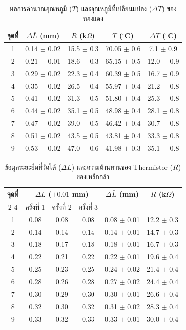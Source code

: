 \documentclass[11pt,a4paper]{article}
\begin{document}
\begin{table}[htbp]
\centering
\caption{ผลการคำนวณอุณหภูมิ ($T$) และอุณหภูมิที่เปลี่ยนแปลง ($\Delta T$) ของทองแดง}
\renewcommand{\arraystretch}{1.2}
\begin{tabular}{|c|c|c|c|c|}
\hline
จุดที่ 
& $\Delta \bar L$ (mm)
& $R$ (k$\Omega$)
& $T$ ($^\circ$C)
& $\Delta T$ ($^\circ$C) \\
\hline
1 & 0.14 $\pm$ 0.02 & 15.5 $\pm$ 0.3 & 70.05 $\pm$ 0.6 & 7.1 $\pm$ 0.9 \\
2 & 0.21 $\pm$ 0.01 & 18.6 $\pm$ 0.3 & 65.15 $\pm$ 0.5 & 12.0 $\pm$ 0.9 \\
3 & 0.29 $\pm$ 0.02 & 22.3 $\pm$ 0.4 & 60.39 $\pm$ 0.5 & 16.7 $\pm$ 0.9 \\
4 & 0.35 $\pm$ 0.02 & 26.5 $\pm$ 0.4 & 55.97 $\pm$ 0.4 & 21.2 $\pm$ 0.8 \\
5 & 0.41 $\pm$ 0.02 & 31.3 $\pm$ 0.5 & 51.80 $\pm$ 0.4 & 25.3 $\pm$ 0.8 \\
6 & 0.44 $\pm$ 0.02 & 35.1 $\pm$ 0.5 & 48.98 $\pm$ 0.4 & 28.1 $\pm$ 0.8 \\
7 & 0.47 $\pm$ 0.02 & 39.0 $\pm$ 0.5 & 46.42 $\pm$ 0.4 & 30.7 $\pm$ 0.8 \\
8 & 0.51 $\pm$ 0.02 & 43.5 $\pm$ 0.5 & 43.81 $\pm$ 0.4 & 33.3 $\pm$ 0.8 \\
9 & 0.53 $\pm$ 0.02 & 47.0 $\pm$ 0.6 & 41.98 $\pm$ 0.3 & 35.1 $\pm$ 0.8 \\
\hline
\end{tabular}
\end{table}



\begin{table}[htbp]
\centering
\caption{ข้อมูลระยะยืดที่วัดได้ ($\Delta L$) และความต้านทานของ Thermistor ($R$) ของเหล็กกล้า}
\renewcommand{\arraystretch}{1.2}
\begin{tabular}{|c|ccc|c|c|}
\hline
จุดที่ 
& \multicolumn{3}{c|}{$\Delta L$ ($\pm 0.01$ mm)} 
& $\Delta \bar L$ (mm)
& $R$ (k$\Omega$) \\
\cline{2-4}
& ครั้งที่ 1 & ครั้งที่ 2 & ครั้งที่ 3 & & \\
\hline
1 & 0.08 & 0.08 & 0.08 & 0.08 $\pm$ 0.01 & 12.2 $\pm$ 0.3 \\
2 & 0.14 & 0.14 & 0.14 & 0.14 $\pm$ 0.01 & 14.7 $\pm$ 0.3 \\
3 & 0.18 & 0.17 & 0.18 & 0.18 $\pm$ 0.01 & 16.7 $\pm$ 0.3 \\
4 & 0.22 & 0.21 & 0.22 & 0.22 $\pm$ 0.01 & 19.6 $\pm$ 0.4 \\
5 & 0.25 & 0.23 & 0.25 & 0.24 $\pm$ 0.02 & 21.4 $\pm$ 0.4 \\
6 & 0.28 & 0.26 & 0.28 & 0.27 $\pm$ 0.02 & 24.4 $\pm$ 0.4 \\
7 & 0.30 & 0.29 & 0.30 & 0.30 $\pm$ 0.01 & 26.6 $\pm$ 0.4 \\
8 & 0.32 & 0.30 & 0.32 & 0.31 $\pm$ 0.02 & 28.3 $\pm$ 0.4 \\
9 & 0.33 & 0.32 & 0.33 & 0.33 $\pm$ 0.01 & 30.0 $\pm$ 0.4 \\
\hline
\end{tabular}
\end{table}
\end{document}
